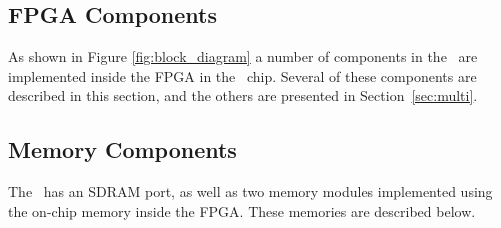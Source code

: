 \subsection{FPGA Components}
\label{sec:fpga}
As shown in Figure \ref{fig:block_diagram} a number of components in the \systemName~are 
implemented inside the FPGA in the \FPGADeviceFamily~chip.  Several of these components 
are described in this section, and the others are presented in Section~\ref{sec:multi}.




\subsection{Memory Components}
The \systemName~has an SDRAM port, as well as two memory modules implemented using the 
on-chip memory inside the FPGA. These memories are described below.





















